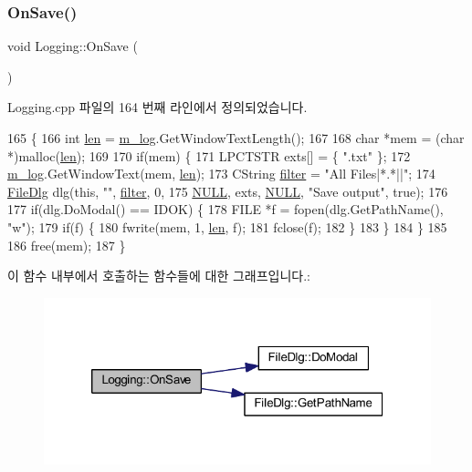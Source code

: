 \subsubsection{\texorpdfstring{On\+Save()}{OnSave()}}
{\footnotesize\ttfamily void Logging\+::\+On\+Save (\begin{DoxyParamCaption}{ }\end{DoxyParamCaption})\hspace{0.3cm}{\ttfamily [protected]}}



Logging.\+cpp 파일의 164 번째 라인에서 정의되었습니다.


\begin{DoxyCode}
165 \{
166   \textcolor{keywordtype}{int} \mbox{\hyperlink{expr-lex_8cpp_afed088663f8704004425cdae2120b9b3}{len}} = \mbox{\hyperlink{class_logging_ab1fbdc0eaf2afc3f7f493a3c9605511c}{m\_log}}.GetWindowTextLength();
167 
168   \textcolor{keywordtype}{char} *mem = (\textcolor{keywordtype}{char} *)malloc(\mbox{\hyperlink{expr-lex_8cpp_afed088663f8704004425cdae2120b9b3}{len}});
169 
170   \textcolor{keywordflow}{if}(mem) \{
171     LPCTSTR exts[] = \{ \textcolor{stringliteral}{".txt"} \};
172     \mbox{\hyperlink{class_logging_ab1fbdc0eaf2afc3f7f493a3c9605511c}{m\_log}}.GetWindowText(mem, \mbox{\hyperlink{expr-lex_8cpp_afed088663f8704004425cdae2120b9b3}{len}});
173     CString \mbox{\hyperlink{_s_d_l_8cpp_af0122ee4312107103b580a98c74a4ea6}{filter}} = \textcolor{stringliteral}{"All Files|*.*||"};
174     \mbox{\hyperlink{class_file_dlg}{FileDlg}} dlg(\textcolor{keyword}{this}, \textcolor{stringliteral}{""}, \mbox{\hyperlink{_s_d_l_8cpp_af0122ee4312107103b580a98c74a4ea6}{filter}}, 0,
175                 \mbox{\hyperlink{getopt1_8c_a070d2ce7b6bb7e5c05602aa8c308d0c4}{NULL}}, exts, \mbox{\hyperlink{getopt1_8c_a070d2ce7b6bb7e5c05602aa8c308d0c4}{NULL}}, \textcolor{stringliteral}{"Save output"}, \textcolor{keyword}{true});
176 
177     \textcolor{keywordflow}{if}(dlg.DoModal() == IDOK) \{
178       FILE *f = fopen(dlg.GetPathName(), \textcolor{stringliteral}{"w"});
179       \textcolor{keywordflow}{if}(f) \{
180         fwrite(mem, 1, \mbox{\hyperlink{expr-lex_8cpp_afed088663f8704004425cdae2120b9b3}{len}}, f);
181         fclose(f);
182       \}
183     \}
184   \}
185 
186   free(mem);
187 \}
\end{DoxyCode}
이 함수 내부에서 호출하는 함수들에 대한 그래프입니다.\+:
\nopagebreak
\begin{figure}[H]
\begin{center}
\leavevmode
\includegraphics[width=320pt]{class_logging_ae00d039caa8724e18442bb7beaf8457c_cgraph}
\end{center}
\end{figure}
